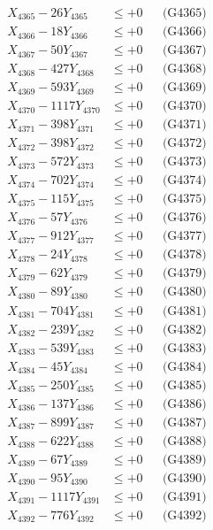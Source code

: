 \documentclass[a4paper,10pt]{article}
\begin{document}
{\begin{align}
X_{4365} - 26Y_{4365} &\leq +0 && \text{(G4365)} \\
X_{4366} - 18Y_{4366} &\leq +0 && \text{(G4366)} \\
X_{4367} - 50Y_{4367} &\leq +0 && \text{(G4367)} \\
X_{4368} - 427Y_{4368} &\leq +0 && \text{(G4368)} \\
X_{4369} - 593Y_{4369} &\leq +0 && \text{(G4369)} \\
X_{4370} - 1117Y_{4370} &\leq +0 && \text{(G4370)} \\
\allowbreak
X_{4371} - 398Y_{4371} &\leq +0 && \text{(G4371)} \\
X_{4372} - 398Y_{4372} &\leq +0 && \text{(G4372)} \\
X_{4373} - 572Y_{4373} &\leq +0 && \text{(G4373)} \\
X_{4374} - 702Y_{4374} &\leq +0 && \text{(G4374)} \\
X_{4375} - 115Y_{4375} &\leq +0 && \text{(G4375)} \\
X_{4376} - 57Y_{4376} &\leq +0 && \text{(G4376)} \\
X_{4377} - 912Y_{4377} &\leq +0 && \text{(G4377)} \\
X_{4378} - 24Y_{4378} &\leq +0 && \text{(G4378)} \\
X_{4379} - 62Y_{4379} &\leq +0 && \text{(G4379)} \\
X_{4380} - 89Y_{4380} &\leq +0 && \text{(G4380)} \\
\allowbreak
X_{4381} - 704Y_{4381} &\leq +0 && \text{(G4381)} \\
X_{4382} - 239Y_{4382} &\leq +0 && \text{(G4382)} \\
X_{4383} - 539Y_{4383} &\leq +0 && \text{(G4383)} \\
X_{4384} - 45Y_{4384} &\leq +0 && \text{(G4384)} \\
X_{4385} - 250Y_{4385} &\leq +0 && \text{(G4385)} \\
X_{4386} - 137Y_{4386} &\leq +0 && \text{(G4386)} \\
X_{4387} - 899Y_{4387} &\leq +0 && \text{(G4387)} \\
X_{4388} - 622Y_{4388} &\leq +0 && \text{(G4388)} \\
X_{4389} - 67Y_{4389} &\leq +0 && \text{(G4389)} \\
X_{4390} - 95Y_{4390} &\leq +0 && \text{(G4390)} \\
\allowbreak
X_{4391} - 1117Y_{4391} &\leq +0 && \text{(G4391)} \\
X_{4392} - 776Y_{4392} &\leq +0 && \text{(G4392)} \\

\end{align}}
\end{document}
